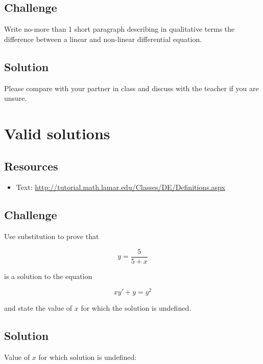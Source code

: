 \subsection*{Challenge}
Write no-more than 1 short paragraph describing in qualitative terms the difference between a linear and non-linear differential equation.

\subsection*{Solution}
Please compare with your partner in class and discuss with the teacher if you are unsure.




\newpage

\section{Valid solutions}

\subsection*{Resources}
\begin{itemize}
    \item Text: \url{http://tutorial.math.lamar.edu/Classes/DE/Definitions.aspx}
\end{itemize}

\subsection*{Challenge}

Use substitution to prove that

\begin{equation}
    y=\frac{5}{5+x}
\end{equation}

is a solution to the equation

\begin{equation}
    x y'+y=y^2
\end{equation}

and state the value of $x$ for which the solution is undefined.

\subsection*{Solution}
Value of $x$ for which solution is undefined:

